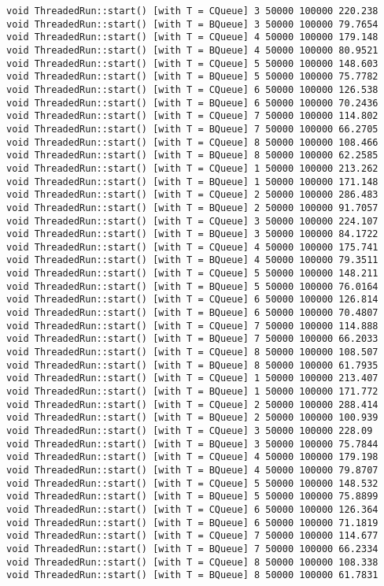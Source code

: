 \begin{verbatim}
void ThreadedRun::start() [with T = CQueue] 3 50000 100000 220.238
void ThreadedRun::start() [with T = BQueue] 3 50000 100000 79.7654
void ThreadedRun::start() [with T = CQueue] 4 50000 100000 179.148
void ThreadedRun::start() [with T = BQueue] 4 50000 100000 80.9521
void ThreadedRun::start() [with T = CQueue] 5 50000 100000 148.603
void ThreadedRun::start() [with T = BQueue] 5 50000 100000 75.7782
void ThreadedRun::start() [with T = CQueue] 6 50000 100000 126.538
void ThreadedRun::start() [with T = BQueue] 6 50000 100000 70.2436
void ThreadedRun::start() [with T = CQueue] 7 50000 100000 114.802
void ThreadedRun::start() [with T = BQueue] 7 50000 100000 66.2705
void ThreadedRun::start() [with T = CQueue] 8 50000 100000 108.466
void ThreadedRun::start() [with T = BQueue] 8 50000 100000 62.2585
void ThreadedRun::start() [with T = CQueue] 1 50000 100000 213.262
void ThreadedRun::start() [with T = BQueue] 1 50000 100000 171.148
void ThreadedRun::start() [with T = CQueue] 2 50000 100000 286.483
void ThreadedRun::start() [with T = BQueue] 2 50000 100000 91.7057
void ThreadedRun::start() [with T = CQueue] 3 50000 100000 224.107
void ThreadedRun::start() [with T = BQueue] 3 50000 100000 84.1722
void ThreadedRun::start() [with T = CQueue] 4 50000 100000 175.741
void ThreadedRun::start() [with T = BQueue] 4 50000 100000 79.3511
void ThreadedRun::start() [with T = CQueue] 5 50000 100000 148.211
void ThreadedRun::start() [with T = BQueue] 5 50000 100000 76.0164
void ThreadedRun::start() [with T = CQueue] 6 50000 100000 126.814
void ThreadedRun::start() [with T = BQueue] 6 50000 100000 70.4807
void ThreadedRun::start() [with T = CQueue] 7 50000 100000 114.888
void ThreadedRun::start() [with T = BQueue] 7 50000 100000 66.2033
void ThreadedRun::start() [with T = CQueue] 8 50000 100000 108.507
void ThreadedRun::start() [with T = BQueue] 8 50000 100000 61.7935
void ThreadedRun::start() [with T = CQueue] 1 50000 100000 213.407
void ThreadedRun::start() [with T = BQueue] 1 50000 100000 171.772
void ThreadedRun::start() [with T = CQueue] 2 50000 100000 288.414
void ThreadedRun::start() [with T = BQueue] 2 50000 100000 100.939
void ThreadedRun::start() [with T = CQueue] 3 50000 100000 228.09
void ThreadedRun::start() [with T = BQueue] 3 50000 100000 75.7844
void ThreadedRun::start() [with T = CQueue] 4 50000 100000 179.198
void ThreadedRun::start() [with T = BQueue] 4 50000 100000 79.8707
void ThreadedRun::start() [with T = CQueue] 5 50000 100000 148.532
void ThreadedRun::start() [with T = BQueue] 5 50000 100000 75.8899
void ThreadedRun::start() [with T = CQueue] 6 50000 100000 126.364
void ThreadedRun::start() [with T = BQueue] 6 50000 100000 71.1819
void ThreadedRun::start() [with T = CQueue] 7 50000 100000 114.677
void ThreadedRun::start() [with T = BQueue] 7 50000 100000 66.2334
void ThreadedRun::start() [with T = CQueue] 8 50000 100000 108.338
void ThreadedRun::start() [with T = BQueue] 8 50000 100000 61.7831
\end{verbatim}
